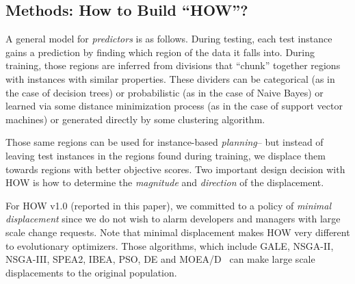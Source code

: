 \documentclass[conference]{IEEEtran}
\begin{document}
\subsection{Methods: How to Build ``HOW''?}

A general model for {\em predictors} is as follows. 
During testing, each test instance gains a  prediction 
by finding which region of the data it falls into.
During training, those regions are inferred from
divisions that ``chunk'' together regions with instances
with similar properties. These dividers can be categorical (as in the case of decision trees) or probabilistic (as in the
case of Naive Bayes) or learned via some distance minimization
process 
(as in the case of support vector machines) or generated
directly by some clustering algorithm. 

Those same regions can be used for instance-based 
{\em planning}-- but instead of leaving test instances in the regions
found during training, we displace them towards regions
with better objective scores. 
Two important design decision with HOW 
is how to determine the {\em magnitude} and {\em direction} of the
displacement.
 
For HOW v1.0 (reported in this paper), we committed to a policy
of {\em minimal displacement}  since we do not wish to alarm developers and managers
with large scale change requests.
Note that minimal displacement makes HOW very different
to evolutionary optimizers.
Those algorithms, which include  
GALE, NSGA-II, NSGA-III, SPEA2, IBEA, PSO, DE and  MOEA/D~\cite{krall14,deb00a,zit02,zit04,%
deb14,Cui2005a,storn97,zhang07:TEC} can make large scale
displacements to the original population.
\end{document}

